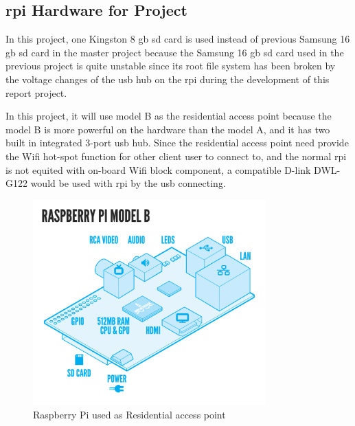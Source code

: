 \subsection{\gls{rpi} Hardware for Project}
\par In this project, one Kingston 8 \gls{gb} \gls{sd} card is used instead of previous Samsung 16 \gls{gb} \gls{sd} card in the master project\cite{TorgeirMR} because the Samsung 16 \gls{gb} \gls{sd} card used in the previous project is quite unstable since its root file system has been broken by the voltage changes of the \gls{usb} hub on the \gls{rpi} during the development of this report project. 
\par In this project, it will use model B as the residential access point because the model B is more powerful on the hardware than the model A, and it has two built in integrated 3-port \gls{usb} hub. Since the residential access point need provide the Wifi hot-spot function for other client user to connect to, and the normal \gls{rpi} is not equited with on-board Wifi block component, a compatible D-link DWL-G122 would be used with \gls{rpi} by the \gls{usb} connecting.
\begin{figure}
	\centering
    	\includegraphics[width=0.80\textwidth,natwidth=610,natheight=642]{figs/RaspiModelB.png}
  	\caption{Raspberry Pi used as Residential access point}
  	\label{fig:rpi}
\end{figure}

